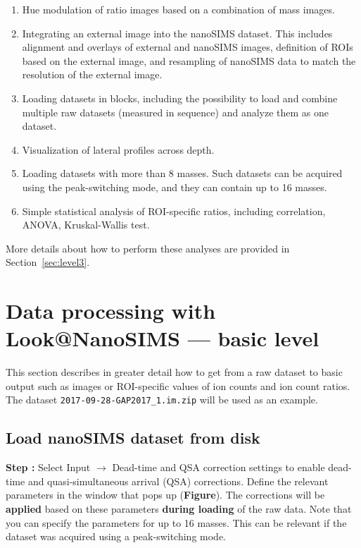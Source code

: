 \documentclass[a4paper, 11pt]{article}
\newcommand{\ttt}[1]{\texttt{#1}}
\newcommand{\lans}[1]{{\color{magenta}#1}}
\newcommand{\lanscb}[1]{{\color{darkgreen}#1}}
\newcommand{\lanstf}[1]{{\color{cyan}#1}}
\newcommand\ra{\rightarrow}
\newcommand\figref[0]{\textbf{Figure}}
\newcounter{step}
\newcommand\s{\addtocounter{step}{1}\noindent\textbf{Step \thestep:}{ }}
\newcommand\bb[1]{\textbf{#1}}
\begin{document}
\begin{enumerate}

\item \lanscb{Hue modulation} of ratio images based on a combination of mass images.

\item Integrating an \lans{external image} into the nanoSIMS dataset. This includes \lans{alignment} and \lans{overlays} of external and nanoSIMS images, definition of \lanstf{ROIs based on the external image}, and \lans{resampling} of nanoSIMS data to match the resolution of the external image.

\item Loading datasets in \lans{blocks}, including the possibility to load and combine multiple raw datasets (measured in sequence) and analyze them as one dataset.

\item Visualization of \lanscb{lateral profiles across depth}.

\item Loading datasets with more than 8 masses. Such datasets can be acquired using the peak-switching mode, and they can contain up to 16 masses.

\item Simple statistical analysis of ROI-specific ratios, including correlation, ANOVA, Kruskal-Wallis test.

\end{enumerate}
%
More details about how to perform these analyses are provided in Section~\ref{sec:level3}.


\section{Data processing with Look@NanoSIMS --- basic level}
\label{sec:level1}

This section describes in greater detail how to get from a raw dataset to basic output such as images or ROI-specific values of ion counts and ion count ratios. The dataset \ttt{2017-09-28-GAP2017\_1.im.zip} will be used as an example.

\addtolength{\parskip}{2mm}

\subsection{Load nanoSIMS dataset from disk}

\s Select \lans{Input} $\ra$ \lans{Dead-time and QSA correction settings} to enable dead-time and quasi-simul\-ta\-neous arrival (QSA) corrections. Define the relevant parameters in the window that pops up (\figref). The corrections will be \bb{applied} based on these parameters \bb{during loading} of the raw data. Note that you can specify the parameters for up to 16 masses. This can be relevant if the dataset was acquired using a peak-switching mode.
\end{document}
